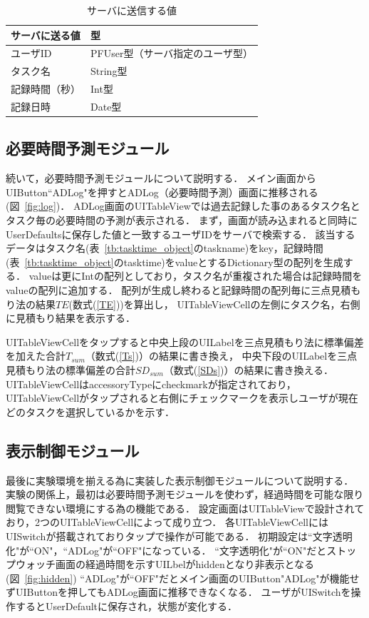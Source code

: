 \begin{table}[htb]
\begin{center}
  \begin{tabular}{|l|l|} \hline
    サーバに送る値 & 型 \\ \hline
    ユーザID & PFUser型（サーバ指定のユーザ型） \\
    タスク名 & String型 \\
    記録時間（秒） & Int型 \\
    記録日時 & Date型 \\
	\hline
  \end{tabular}
  \caption{サーバに送信する値}
  \label{tb:study_record}
\end{center}
\end{table}


\subsection{必要時間予測モジュール}  
続いて，必要時間予測モジュールについて説明する．
メイン画面からUIButton``ADLog"を押すとADLog（必要時間予測）画面に推移される(図~\ref{fig:log})．
ADLog画面のUITableViewでは過去記録した事のあるタスク名とタスク毎の必要時間の予測が表示される．
まず，画面が読み込まれると同時にUserDefaultsに保存した値と一致するユーザIDをサーバで検索する．
該当するデータはタスク名(表~\ref{tb:tasktime_object}のtaskname)をkey，記録時間(表~\ref{tb:tasktime_object}のtasktime)をvalueとするDictionary型の配列を生成する．
valueは更にIntの配列としており，タスク名が重複された場合は記録時間をvalueの配列に追加する．
配列が生成し終わると記録時間の配列毎に三点見積もり法の結果$TE$(数式(\ref{TE}))を算出し，
UITableViewCellの左側にタスク名，右側に見積もり結果を表示する．

UITableViewCellをタップすると中央上段のUILabelを三点見積もり法に標準偏差を加えた合計$T_{sum}$（数式(\ref{Ts})）の結果に書き換え，
中央下段のUILabelを三点見積もり法の標準偏差の合計$SD_{sum}$（数式(\ref{SDs})）の結果に書き換える．
UITableViewCellはaccessoryTypeにcheckmarkが指定されており，UITableViewCellがタップされると右側にチェックマークを表示しユーザが現在どのタスクを選択しているかを示す．

\subsection{表示制御モジュール}  
最後に実験環境を揃える為に実装した表示制御モジュールについて説明する．
実験の関係上，最初は必要時間予測モジュールを使わず，経過時間を可能な限り閲覧できない環境にする為の機能である．
設定画面はUITableViewで設計されており，2つのUITableViewCellによって成り立つ．
各UITableViewCellにはUISwitchが搭載されておりタップで操作が可能である．
初期設定は``文字透明化"が``ON"，``ADLog"が``OFF"になっている．
``文字透明化"が``ON"だとストップウォッチ画面の経過時間を示すUILbelがhiddenとなり非表示となる(図~\ref{fig:hidden})
``ADLog"が``OFF"だとメイン画面のUIButton"ADLog"が機能せずUIButtonを押してもADLog画面に推移できなくなる．
ユーザがUISwitchを操作するとUserDefaultに保存され，状態が変化する．

